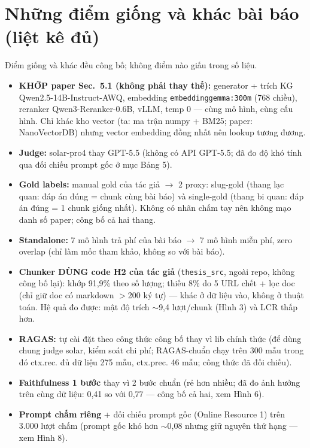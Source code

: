 \documentclass[12pt,a4paper]{article}
\begin{document}
\section{Những điểm giống và khác bài báo (liệt kê đủ)}
Điểm giống và khác đều công bố; không điểm nào giấu trong số liệu.
\begin{itemize}[leftmargin=*]
\item \textbf{KHỚP paper Sec.~5.1 (không phải thay thế):} generator + trích KG
Qwen2.5-14B-Instruct-AWQ, embedding \texttt{embeddinggemma:300m} (768 chiều),
reranker Qwen3-Reranker-0.6B, vLLM, temp 0 --- cùng mô hình, cùng cấu hình.
Chỉ khác kho vector (ta: ma trận numpy + BM25; paper: NanoVectorDB) nhưng
vector embedding đồng nhất nên lookup tương đương.
\item \textbf{Judge:} solar-pro4 thay GPT-5.5 (không có API GPT-5.5; đã đo độ
khó tính qua đối chiếu prompt gốc ở mục Bảng 5).
\item \textbf{Gold labels:} manual gold của tác giả $\rightarrow$ 2 proxy:
slug-gold (thang lạc quan: đáp án đúng = chunk cùng bài báo) và single-gold
(thang bi quan: đáp án đúng = 1 chunk giống nhất). Không có nhãn chấm tay nên
không mạo danh số paper; công bố cả hai thang.
\item \textbf{Standalone:} 7 mô hình trả phí của bài báo $\rightarrow$ 7 mô
hình miễn phí, zero overlap (chỉ làm mốc tham khảo, không so với bài báo).
\item \textbf{Chunker DÙNG code H2 của tác giả} (\texttt{thesis\_src}, ngoài
repo, không công bố lại): khớp 91,9\% theo số lượng; thiếu 8\% do 5 URL chết +
lọc doc (chỉ giữ doc có markdown $>$200 ký tự) --- khác ở dữ liệu vào, không ở
thuật toán. Hệ quả đo được: mật độ trích $\sim$9,4 lượt/chunk (Hình 3) và LCR
thấp hơn.
\item \textbf{RAGAS:} tự cài đặt theo công thức công bố thay vì lib chính
thức (để dùng chung judge solar, kiểm soát chi phí; RAGAS-chuẩn chạy trên 300
mẫu trong đó ctx.rec. đủ dữ liệu 275 mẫu, ctx.prec. 46 mẫu; công thức đã đối
chiếu).
\item \textbf{Faithfulness 1 bước} thay vì 2 bước chuẩn (rẻ hơn nhiều; đã đo
ảnh hưởng trên cùng dữ liệu: 0,41 so với 0,77 --- công bố cả hai, xem Hình 6).
\item \textbf{Prompt chấm riêng} + đối chiếu prompt gốc (Online Resource 1)
trên 3.000 lượt chấm (prompt gốc khó hơn $\sim$0,08 nhưng giữ nguyên thứ
hạng --- xem Hình 8).
\end{itemize}
\end{document}
